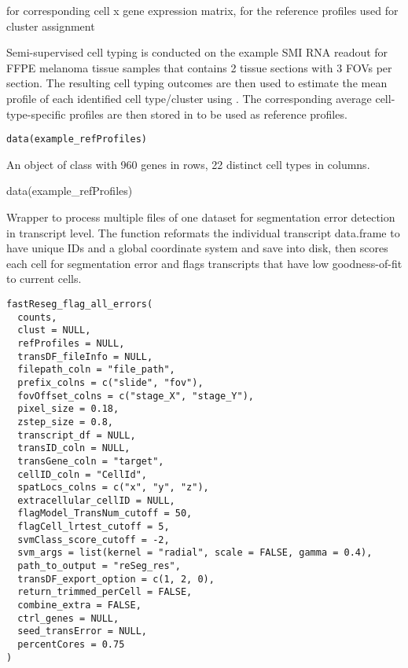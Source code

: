 \documentclass[letterpaper]{book}
\begin{document}
%
\begin{SeeAlso}
 for corresponding cell x gene expression matrix,  for the reference profiles used for cluster assignment
\end{SeeAlso}
%
\begin{Description}
Semi-supervised cell typing is conducted on the example SMI RNA readout for FFPE melanoma tissue samples that contains 2 tissue sections with 3 FOVs per section. The resulting cell typing outcomes are then used to estimate the mean profile of each identified cell type/cluster using . The corresponding average cell-type-specific profiles are then stored in  to be used as reference profiles.
\end{Description}
%
\begin{Usage}
\begin{verbatim}
data(example_refProfiles)
\end{verbatim}
\end{Usage}
%
\begin{Format}
An object of class  with 960 genes in rows, 22 distinct cell types in columns.
\end{Format}
%
\begin{Examples}
\begin{ExampleCode}
data(example_refProfiles)
\end{ExampleCode}
\end{Examples}
%
\begin{Description}
Wrapper to process multiple files of one dataset for segmentation error detection in transcript level. The function reformats the individual transcript data.frame to have unique IDs and a global coordinate system and save into disk, then scores each cell for segmentation error and flags transcripts that have low goodness-of-fit to current cells.
\end{Description}
%
\begin{Usage}
\begin{verbatim}
fastReseg_flag_all_errors(
  counts,
  clust = NULL,
  refProfiles = NULL,
  transDF_fileInfo = NULL,
  filepath_coln = "file_path",
  prefix_colns = c("slide", "fov"),
  fovOffset_colns = c("stage_X", "stage_Y"),
  pixel_size = 0.18,
  zstep_size = 0.8,
  transcript_df = NULL,
  transID_coln = NULL,
  transGene_coln = "target",
  cellID_coln = "CellId",
  spatLocs_colns = c("x", "y", "z"),
  extracellular_cellID = NULL,
  flagModel_TransNum_cutoff = 50,
  flagCell_lrtest_cutoff = 5,
  svmClass_score_cutoff = -2,
  svm_args = list(kernel = "radial", scale = FALSE, gamma = 0.4),
  path_to_output = "reSeg_res",
  transDF_export_option = c(1, 2, 0),
  return_trimmed_perCell = FALSE,
  combine_extra = FALSE,
  ctrl_genes = NULL,
  seed_transError = NULL,
  percentCores = 0.75
)
\end{verbatim}
\end{Usage}
\end{document}
